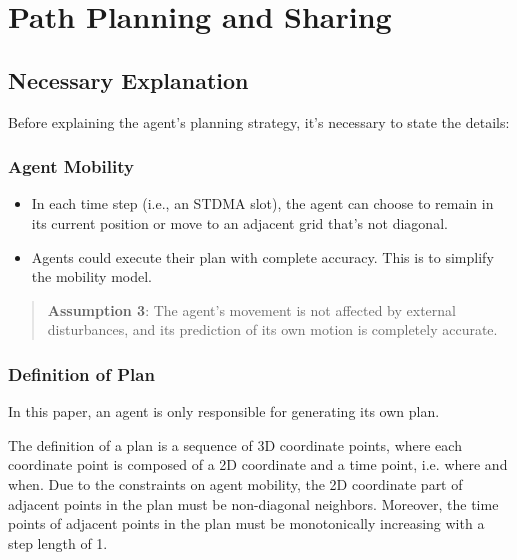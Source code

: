 \section{Path Planning and Sharing}


\subsection{Necessary Explanation}

Before explaining the agent's planning strategy, it's necessary to state the details:

\subsubsection{Agent Mobility}

\begin{itemize}
    \item In each time step (i.e., an STDMA slot), the agent can choose to remain in its current position or move to an adjacent grid that's not diagonal.
    \item Agents could execute their plan with complete accuracy. This is to simplify the mobility model.
\end{itemize}

\begin{quotation}
    \textbf{Assumption 3}: 
    The agent's movement is not affected by external disturbances, and its prediction of its own motion is completely accurate.
\end{quotation}

\subsubsection{Definition of Plan}
In this paper, an agent is only responsible for generating its own plan.

The definition of a plan is a sequence of 3D coordinate points, where each coordinate point is composed of a 2D coordinate and a time point, i.e. where and when.
Due to the constraints on agent mobility, the 2D coordinate part of adjacent points in the plan must be non-diagonal neighbors. Moreover, the time points of adjacent points in the plan must be monotonically increasing with a step length of 1.

